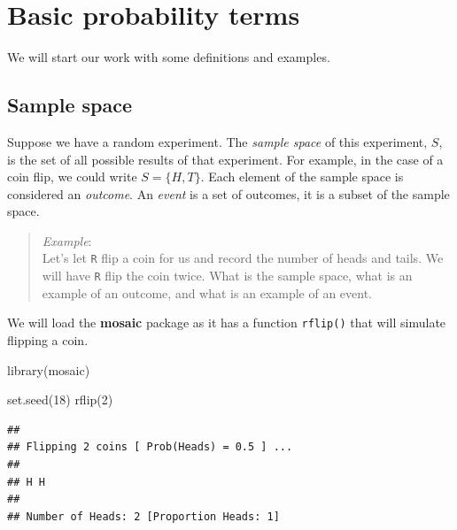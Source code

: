 \documentclass[
]{book}
\newenvironment{Shaded}{\begin{snugshade}}{\end{snugshade}}
\newcommand{\DecValTok}[1]{\textcolor[rgb]{0.00,0.00,0.81}{#1}}
\newcommand{\FunctionTok}[1]{\textcolor[rgb]{0.00,0.00,0.00}{#1}}
\newcommand{\NormalTok}[1]{#1}
\begin{document}
\hypertarget{basic-probability-terms}{%
\section{Basic probability terms}\label{basic-probability-terms}}

We will start our work with some definitions and examples.

\hypertarget{sample-space}{%
\subsection{Sample space}\label{sample-space}}

Suppose we have a random experiment. The \emph{sample space} of this experiment, \(S\), is the set of all possible results of that experiment. For example, in the case of a coin flip, we could write \(S=\{H,T\}\). Each element of the sample space is considered an \emph{outcome}. An \emph{event} is a set of outcomes, it is a subset of the sample space.

\begin{quote}
\emph{Example}:\\
Let's let \texttt{R} flip a coin for us and record the number of heads and tails. We will have \texttt{R} flip the coin twice. What is the sample space, what is an example of an outcome, and what is an example of an event.
\end{quote}

We will load the \textbf{mosaic} package as it has a function \texttt{rflip()} that will simulate flipping a coin.

\begin{Shaded}
\begin{Highlighting}[]
\FunctionTok{library}\NormalTok{(mosaic)}
\end{Highlighting}
\end{Shaded}

\begin{Shaded}
\begin{Highlighting}[]
\FunctionTok{set.seed}\NormalTok{(}\DecValTok{18}\NormalTok{)}
\FunctionTok{rflip}\NormalTok{(}\DecValTok{2}\NormalTok{)}
\end{Highlighting}
\end{Shaded}

\begin{verbatim}
## 
## Flipping 2 coins [ Prob(Heads) = 0.5 ] ...
## 
## H H
## 
## Number of Heads: 2 [Proportion Heads: 1]
\end{verbatim}
\end{document}
